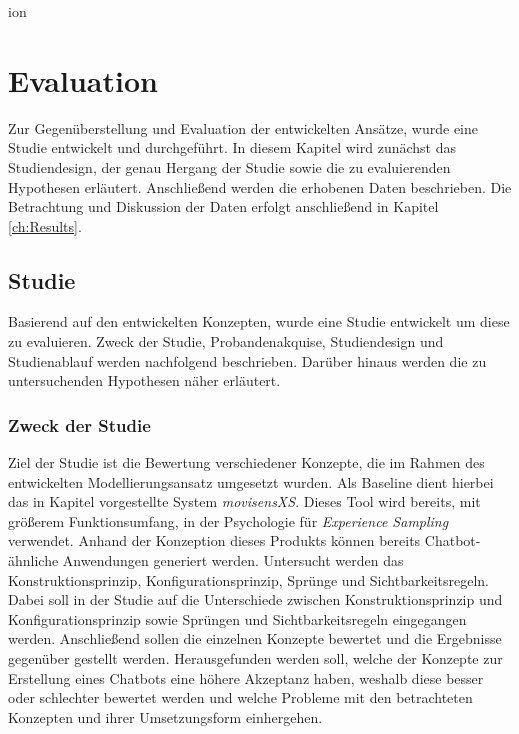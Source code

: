 
ion\chapter{Evaluation}
\label{ch:evaluation}

Zur Gegenüberstellung und Evaluation der entwickelten Ansätze, wurde eine Studie entwickelt und durchgeführt. In diesem Kapitel wird zunächst das Studiendesign, der genau Hergang der Studie sowie die zu evaluierenden Hypothesen erläutert. Anschließend werden die erhobenen Daten beschrieben. Die Betrachtung und Diskussion der Daten erfolgt anschließend in Kapitel \ref{ch:Results}. 

\section{Studie}
Basierend auf den entwickelten Konzepten, wurde eine Studie entwickelt um diese zu evaluieren. Zweck der Studie, Probandenakquise, Studiendesign und Studienablauf werden nachfolgend beschrieben. Darüber hinaus werden die zu untersuchenden Hypothesen näher erläutert. 



\subsection{Zweck der Studie}
Ziel der Studie ist die Bewertung verschiedener Konzepte, die im Rahmen des entwickelten Modellierungsansatz umgesetzt wurden. Als Baseline dient hierbei das in Kapitel  vorgestellte System \emph{movisensXS}. Dieses Tool wird bereits, mit größerem Funktionsumfang, in der Psychologie für \emph{Experience Sampling} verwendet. Anhand der Konzeption dieses Produkts können bereits Chatbot-ähnliche Anwendungen generiert werden. Untersucht werden das Konstruktionsprinzip, Konfigurationsprinzip, Sprünge und Sichtbarkeitsregeln. Dabei soll in der Studie auf die Unterschiede zwischen Konstruktionsprinzip und Konfigurationsprinzip sowie Sprüngen und Sichtbarkeitsregeln eingegangen werden. Anschließend sollen die einzelnen Konzepte bewertet und die Ergebnisse gegenüber gestellt werden. Herausgefunden werden soll, welche der Konzepte zur Erstellung eines Chatbots eine höhere Akzeptanz haben, weshalb diese besser oder schlechter bewertet werden und welche Probleme mit den betrachteten Konzepten und ihrer Umsetzungsform einhergehen. 

